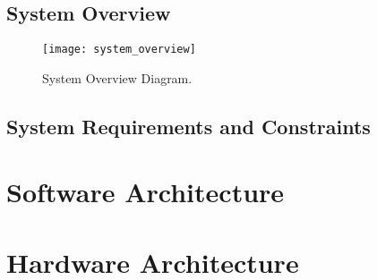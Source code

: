 \subsection{System Overview}


\begin{figure}[ht]
	\centering
	\texttt{[image: system\_overview]}
	\caption{System Overview Diagram.}
	\label{fig:system_overview}
\end{figure}


\subsection{System Requirements and Constraints}

\section{Software Architecture}

\section{Hardware Architecture}
